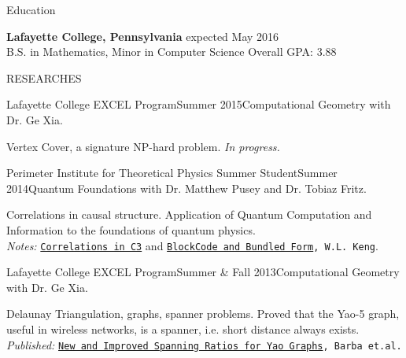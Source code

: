 \documentclass{resume} %
\begin{document}
\begin{rSection}{Education}

{\bf Lafayette College, Pennsylvania} \hfill expected May 2016\\ 
B.S. in Mathematics, Minor in Computer Science \hfill Overall GPA: 3.88
\end{rSection}


\begin{rSection}{RESEARCHES}

\begin{rSubsection}{Lafayette College EXCEL Program}{Summer 2015}{Computational Geometry with Dr. Ge Xia.}{}
\item Vertex Cover, a signature NP-hard problem. {\em In progress.}
\end{rSubsection}


\begin{rSubsection}{Perimeter Institute for Theoretical Physics Summer Student}{Summer 2014}{Quantum Foundations with Dr. Matthew Pusey and Dr. Tobiaz Fritz.}{}
\item Correlations in causal structure. Application of Quantum Computation and Information to the foundations of quantum physics. \\
{\em Notes:} {\tt \href{https://github.com/kengz/Quantum-Foundations-Correlations/blob/master/Keng%20Correlations%20in%20C3.pdf}{Correlations in C3}} and {\tt \href{https://github.com/kengz/Quantum-Foundations-Correlations/blob/master/Keng%20blockcode.pdf}{BlockCode and Bundled Form}, W.L. Keng}.
\end{rSubsection}


\begin{rSubsection}{Lafayette College EXCEL Program}{Summer \& Fall 2013}{Computational Geometry with Dr. Ge Xia.}{}
\item Delaunay Triangulation, graphs, spanner problems. Proved that the Yao-5 graph, useful in wireless networks, is a spanner, i.e. short distance always exists.\\
{\em Published:} {\tt \href{http://arxiv.org/abs/1307.5829}{New and Improved Spanning Ratios for Yao Graphs}, Barba et.al.}\\
\end{rSubsection}


\end{rSection}
\end{document}
